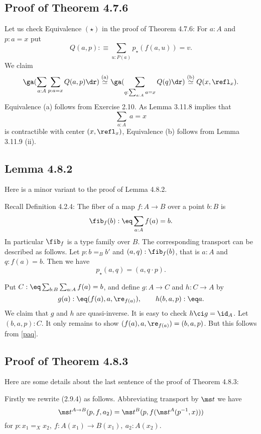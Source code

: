 \documentclass[12pt]{article}
\begin{document}

\subsection{Proof of Theorem 4.7.6}

Let us check Equivalence $(\star)$ in the proof of Theorem 4.7.6: For $a:A$ and $p:a=x$ put 
$$
Q(a,p):\equiv\sum_{u:P(a)}p_\star(f(a,u))=v.
$$ 
We claim 
$$
\ga(\sum_{a:A}\sum_{p:a=x}Q(a,p)\dr)\overset{(\text a)}{\simeq}
\ga(\sum_{q:\sum_{a:A}a=x}Q(q)\dr)\overset{(\text b)}{\simeq}
Q(x,\refl_x).
$$
Equivalence (a) follows from Exercise 2.10. As Lemma 3.11.8 implies that 
$$
\sum_{a:A}\ a=x
$$ 
is contractible with center $(x,\refl_x)$, Equivalence (b) follows from Lemma 3.11.9 (ii). 


\subsection{Lemma 4.8.2}

Here is a minor variant to the proof of Lemma 4.8.2.

Recall Definition 4.2.4: The fiber of a map $f:A\to B$ over a point $b:B$ is 
$$
\fib_f(b):\eq\sum_{a:A}f(a)=b.
$$ 
In particular $\fib_f$ is a type family over $B$. The corresponding transport can be described as follows. Let $p:b=_Bb'$ and $(a,q):\fib_f(b)$, that is $a:A$ and $q:f(a)=b$. Then we have 
\begin{equation}\label{paq}
p_\star(a,q)=(a,q\cdot p).
\end{equation}

Put $C:\eq\sum_{b:B}\sum_{a:A}f(a)=b$, and define $g:A\to C$ and $h:C\to A$ by 
$$
g(a):\eq(f(a),a,\re_{f(a)}),\qquad h(b,a,p):\eq a.
$$ 
We claim that $g$ and $h$ are quasi-inverse. It is easy to check $h\ci g=\id_A$. Let $(b,a,p):C$. It only remains to show $(f(a),a,\re_{f(a)})=(b,a,p)$. But this follows from \eqref{paq}.


\subsection{Proof of Theorem 4.8.3}

Here are some details about the last sentence of the proof of Theorem 4.8.3:

Firstly we rewrite (2.9.4) as follows. Abbreviating transport by $\ms t$ we have 
\begin{equation}\label{2.9.4}
\ms t^{A\to B}(p,f,a_2)=\ms t^B(p,f(\ms t^A(p^{-1},x)))
\end{equation}
for $p:x_1=_Xx_2,\ f:A(x_1)\to B(x_1),\ a_2:A(x_2)$. 
\end{document}
